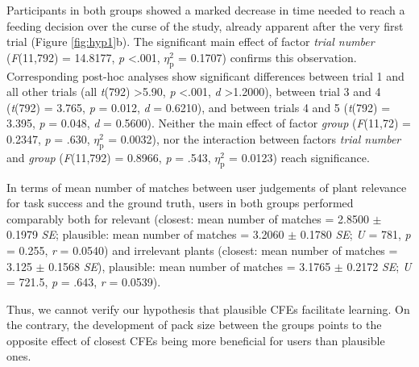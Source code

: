Participants in both groups showed a marked decrease in time needed to reach a feeding decision over the curse of the study, already apparent after the very first trial (Figure \ref{fig:hyp1}b).
The significant main effect of factor \textit{trial number} (\textit{F}(11,792) = 14.8177, \textit{p} \textless .001, $\eta_{\text{p}}^{2}$ = 0.1707) confirms this observation.
Corresponding post-hoc analyses show significant differences between trial 1 and all other trials (all \textit{t}(792) \textgreater 5.90, \textit{p} \textless .001, \textit{d} \textgreater 1.2000), between trial 3 and 4 (\textit{t}(792) = 3.765, \textit{p} = 0.012, \textit{d} = 0.6210), and between trials 4 and 5 (\textit{t}(792) = 3.395, \textit{p} = 0.048, \textit{d} = 0.5600).
Neither the main effect of factor \textit{group} (\textit{F}(11,72) = 0.2347, \textit{p} = .630, $\eta_{\text{p}}^{2}$ = 0.0032), nor the interaction between factors \textit{trial number} and \textit{group} (\textit{F}(11,792) = 0.8966, \textit{p} = .543, $\eta_{\text{p}}^{2}$ = 0.0123) reach significance.

In terms of mean number of matches between user judgements of plant relevance for task success and the ground truth, users in both groups performed comparably both for relevant 
(closest: mean number of matches = 2.8500 $\pm$ 0.1979 \textit{SE}; plausible: mean number of matches = 3.2060 $\pm$ 0.1780 \textit{SE}; \textit{U} = 781, \textit{p} = 0.255, \textit{r} = 0.0540)
and irrelevant plants (closest: mean number of matches = 3.125 $\pm$ 0.1568 \textit{SE}), plausible: mean number of matches = 3.1765 $\pm$ 0.2172 \textit{SE}; \textit{U} = 721.5, \textit{p} = .643, \textit{r} = 0.0539).

Thus, we cannot verify our hypothesis that plausible \glspl{CFE} facilitate learning. On the contrary, the development of pack size between the groups points to the opposite effect of closest \glspl{CFE} being more beneficial for users than plausible ones.

